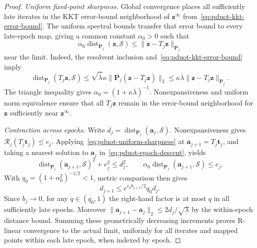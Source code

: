 \begin{proof}
\par\smallskip\noindent\textit{Uniform fixed-point sharpness.}
Global convergence places all sufficiently late iterates in the KKT error-bound neighborhood of $\mathbf z^\infty$ from~\eqref{eq:pduot-kkt-error-bound}.
The uniform spectral bounds transfer that error bound to every late-epoch map, giving a common constant $\alpha_0>0$ such that
\begin{equation}
\label{eq:pduot-uniform-sharpness}
\alpha_0\operatorname{dist}_{\mathbf P_j}(\mathbf z,\mathcal S)\leq\|\mathbf z-T_j\mathbf z\|_{\mathbf P_j}
\end{equation}
near the limit.
Indeed, the resolvent inclusion and~\eqref{eq:pduot-kkt-error-bound} imply
\begin{equation*}
\operatorname{dist}_{\mathbf P_j}(T_j\mathbf z,\mathcal S)\leq\sqrt{\overline\lambda}\kappa\|\mathbf P_j(\mathbf z-T_j\mathbf z)\|_2\leq\kappa\overline\lambda\|\mathbf z-T_j\mathbf z\|_{\mathbf P_j}.
\end{equation*}
The triangle inequality gives $\alpha_0=(1+\kappa\overline\lambda)^{-1}$.
Nonexpansiveness and uniform norm equivalence ensure that all $T_j\mathbf z$ remain in the error-bound neighborhood for $\mathbf z$ sufficiently near $\mathbf z^\infty$.

\par\smallskip\noindent\textit{Contraction across epochs.}
Write $d_j=\operatorname{dist}_{\mathbf P_j}(\mathbf a_j,\mathcal S)$.
Nonexpansiveness gives $\mathcal R_j(T_j\mathbf t_j)\leq e_j$.
Applying~\eqref{eq:pduot-uniform-sharpness} at $\mathbf a_{j+1}=T_j\mathbf t_j$, and taking a nearest solution to $\mathbf a_j$ in~\eqref{eq:pduot-epoch-descent}, yields
\begin{equation*}
\operatorname{dist}_{\mathbf P_j}(\mathbf a_{j+1},\mathcal S)^2+e_j^2\leq d_j^2,\qquad \alpha_0\operatorname{dist}_{\mathbf P_j}(\mathbf a_{j+1},\mathcal S)\leq e_j.
\end{equation*}
With $q_0=(1+\alpha_0^2)^{-1/2}<1$, metric comparison then gives
\begin{equation*}
d_{j+1}\leq e^{c_0b_{j+1}/2}q_0d_j.
\end{equation*}
Since $b_j\to0$, for any $q\in(q_0,1)$ the right-hand factor is at most $q$ in all sufficiently late epochs.
Moreover $\|\mathbf a_{j+1}-\mathbf a_j\|_2\leq2d_j/\sqrt{\underline\lambda}$ by the within-epoch distance bound.
Summing these geometrically decreasing increments proves R-linear convergence to the actual limit, uniformly for all iterates and mapped points within each late epoch, when indexed by epoch.


\end{proof}

